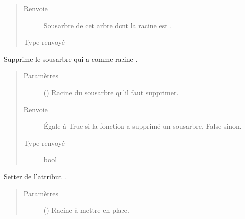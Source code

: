 \documentclass[letterpaper,10pt,french]{sphinxmanual}
\begin{document}
\begin{fulllineitems}
\begin{fulllineitems}
\begin{quote}
\begin{description}
\item[{Renvoie}] \leavevmode
{} \textendash{} Sous\sphinxhyphen{}arbre de cet arbre dont la racine est .

\item[{Type renvoyé}] \leavevmode
{\hyperref[\detokenize{index:StrategyTree.StrategyTree}]{}}

\end{description}\end{quote}

\end{fulllineitems}


\begin{fulllineitems}
\label{\detokenize{index:StrategyTree.StrategyTree.remove_sub_tree}}
Supprime le sous\sphinxhyphen{}arbre qui a comme racine .
\begin{quote}\begin{description}
\item[{Paramètres}] \leavevmode
{} () \textendash{} Racine du sous\sphinxhyphen{}arbre qu’il faut supprimer.

\item[{Renvoie}] \leavevmode
{} \textendash{} Égale à True si la fonction a supprimé un sous\sphinxhyphen{}arbre, False sinon.

\item[{Type renvoyé}] \leavevmode
bool

\end{description}\end{quote}

\end{fulllineitems}


\begin{fulllineitems}
\label{\detokenize{index:StrategyTree.StrategyTree.set_root}}
Setter de l’attribut .
\begin{quote}\begin{description}
\item[{Paramètres}] \leavevmode
{} ({\hyperref[\detokenize{index:StrategyTree.NodeST}]{}}) \textendash{} Racine à mettre en place.


\end{description}
\end{quote}
\end{fulllineitems}
\end{fulllineitems}
\end{document}
